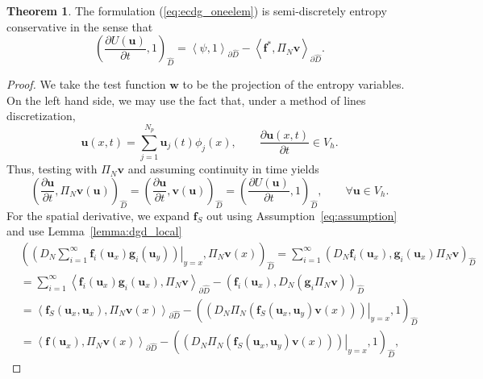 \documentclass[preprint,10pt]{article}
\theoremstyle{definition}
\theoremstyle{lemma}
\theoremstyle{theorem}
\newtheorem{theorem}{Theorem}
\theoremstyle{assumption}
\newcommand{\pd}[2]{\frac{\partial#1}{\partial#2}}
\newcommand{\LRp}[1]{\left( #1 \right)}
\newcommand{\LRa}[1]{\left\langle #1 \right\rangle}
\begin{document}
\begin{theorem}
\label{lemma:ec1}
The formulation (\ref{eq:ecdg_oneelem})
 is semi-discretely entropy conservative in the sense that
\[
\LRp{\pd{U(\bm{u})}{t},1}_{\widehat{D}} =  \LRa{\psi,1}_{\partial \widehat{D}}-\LRa{{\bm{f}^*, \Pi_N\bm{v}}}_{\partial \widehat{D}}.
\]
\end{theorem}
\begin{proof}
We take the test function $\bm{w}$ to be the projection of the entropy variables.  On the left hand side, we may use the fact that, under a method of lines discretization, 
\[
\bm{u}(x,t) = \sum_{j=1}^{N_p} \bm{u}_j(t) \phi_j(x), \qquad \pd{\bm{u}(x,t)}{t} \in V_h.
\]
Thus, testing with $\Pi_N \bm{v}$ and assuming continuity in time yields 
\[
\LRp{\pd{\bm{u}}{t}, \Pi_N \bm{v}(\bm{u})}_{\widehat{D}} = \LRp{\pd{\bm{u}}{t},\bm{v}(\bm{u})}_{\widehat{D}} = \LRp{\pd{U(\bm{u})}{t},1}_{\widehat{D}}, \qquad \forall \bm{u}\in V_h.
\]
For the spatial derivative, we expand $\bm{f}_S$ out using Assumption~\ref{eq:assumption} and use Lemma~\ref{lemma:dgd_local}
\begin{align*}
&\LRp{\left.\LRp{D_N \sum_{i=1}^{\infty}\bm{f}_i(\bm{u}_x)\bm{g}_i(\bm{u}_y)}\right|_{y=x}, \Pi_N\bm{v}(x)}_{\widehat{D}} = \sum_{i=1}^{\infty} \LRp{{D_N \bm{f}_i(\bm{u}_x)}, {\bm{g}_i(\bm{u}_x)\Pi_N\bm{v} }}_{\widehat{D}}\\
&= \sum_{i=1}^{\infty}\LRa{\bm{f}_i(\bm{u}_x) \bm{g}_i(\bm{u}_x),\Pi_N\bm{v}}_{\partial \widehat{D}}  - \LRp{ \bm{f}_i(\bm{u}_x), D_N \LRp{\bm{g}_i\Pi_N\bm{v} }}_{\widehat{D}}\\
&= \LRa{\bm{f}_S(\bm{u}_x,\bm{u}_x), \Pi_N\bm{v}(x)}_{\partial \widehat{D}}  - \LRp{\left.\LRp{D_N \Pi_N\LRp{\bm{f}_S(\bm{u}_x,\bm{u}_y)\bm{v}(x)} }\right|_{y=x},1}_{\widehat{D}}\\
&= \LRa{\bm{f}(\bm{u}_x), \Pi_N\bm{v}(x)}_{\partial \widehat{D}}  - \LRp{\left.\LRp{D_N \Pi_N\LRp{\bm{f}_S(\bm{u}_x,\bm{u}_y)\bm{v}(x)} }\right|_{y=x},1}_{\widehat{D}},
\end{align*}

\end{proof}
\end{document}
